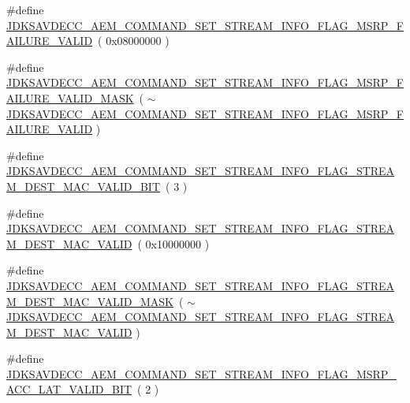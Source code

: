 \begin{DoxyCompactItemize}
\item 
\#define \hyperlink{group__command__set__stream__info_ga48cf25726faa693ebe64e3c71e38fd94}{J\+D\+K\+S\+A\+V\+D\+E\+C\+C\+\_\+\+A\+E\+M\+\_\+\+C\+O\+M\+M\+A\+N\+D\+\_\+\+S\+E\+T\+\_\+\+S\+T\+R\+E\+A\+M\+\_\+\+I\+N\+F\+O\+\_\+\+F\+L\+A\+G\+\_\+\+M\+S\+R\+P\+\_\+\+F\+A\+I\+L\+U\+R\+E\+\_\+\+V\+A\+L\+ID}~( 0x08000000 )
\item 
\#define \hyperlink{group__command__set__stream__info_gac39b2038ce5850cc7c1282abb61c1292}{J\+D\+K\+S\+A\+V\+D\+E\+C\+C\+\_\+\+A\+E\+M\+\_\+\+C\+O\+M\+M\+A\+N\+D\+\_\+\+S\+E\+T\+\_\+\+S\+T\+R\+E\+A\+M\+\_\+\+I\+N\+F\+O\+\_\+\+F\+L\+A\+G\+\_\+\+M\+S\+R\+P\+\_\+\+F\+A\+I\+L\+U\+R\+E\+\_\+\+V\+A\+L\+I\+D\+\_\+\+M\+A\+SK}~( $\sim$\hyperlink{group__command__set__stream__info_ga48cf25726faa693ebe64e3c71e38fd94}{J\+D\+K\+S\+A\+V\+D\+E\+C\+C\+\_\+\+A\+E\+M\+\_\+\+C\+O\+M\+M\+A\+N\+D\+\_\+\+S\+E\+T\+\_\+\+S\+T\+R\+E\+A\+M\+\_\+\+I\+N\+F\+O\+\_\+\+F\+L\+A\+G\+\_\+\+M\+S\+R\+P\+\_\+\+F\+A\+I\+L\+U\+R\+E\+\_\+\+V\+A\+L\+ID} )
\item 
\#define \hyperlink{group__command__set__stream__info_ga37f7565f16e7f28d3f6a6011d74adf4e}{J\+D\+K\+S\+A\+V\+D\+E\+C\+C\+\_\+\+A\+E\+M\+\_\+\+C\+O\+M\+M\+A\+N\+D\+\_\+\+S\+E\+T\+\_\+\+S\+T\+R\+E\+A\+M\+\_\+\+I\+N\+F\+O\+\_\+\+F\+L\+A\+G\+\_\+\+S\+T\+R\+E\+A\+M\+\_\+\+D\+E\+S\+T\+\_\+\+M\+A\+C\+\_\+\+V\+A\+L\+I\+D\+\_\+\+B\+IT}~( 3 )
\item 
\#define \hyperlink{group__command__set__stream__info_gaeade7ce92575e0d1232858e16f73758d}{J\+D\+K\+S\+A\+V\+D\+E\+C\+C\+\_\+\+A\+E\+M\+\_\+\+C\+O\+M\+M\+A\+N\+D\+\_\+\+S\+E\+T\+\_\+\+S\+T\+R\+E\+A\+M\+\_\+\+I\+N\+F\+O\+\_\+\+F\+L\+A\+G\+\_\+\+S\+T\+R\+E\+A\+M\+\_\+\+D\+E\+S\+T\+\_\+\+M\+A\+C\+\_\+\+V\+A\+L\+ID}~( 0x10000000 )
\item 
\#define \hyperlink{group__command__set__stream__info_gacd1c2aed1935c2d72effa37dcd8f0bc6}{J\+D\+K\+S\+A\+V\+D\+E\+C\+C\+\_\+\+A\+E\+M\+\_\+\+C\+O\+M\+M\+A\+N\+D\+\_\+\+S\+E\+T\+\_\+\+S\+T\+R\+E\+A\+M\+\_\+\+I\+N\+F\+O\+\_\+\+F\+L\+A\+G\+\_\+\+S\+T\+R\+E\+A\+M\+\_\+\+D\+E\+S\+T\+\_\+\+M\+A\+C\+\_\+\+V\+A\+L\+I\+D\+\_\+\+M\+A\+SK}~( $\sim$\hyperlink{group__command__set__stream__info_gaeade7ce92575e0d1232858e16f73758d}{J\+D\+K\+S\+A\+V\+D\+E\+C\+C\+\_\+\+A\+E\+M\+\_\+\+C\+O\+M\+M\+A\+N\+D\+\_\+\+S\+E\+T\+\_\+\+S\+T\+R\+E\+A\+M\+\_\+\+I\+N\+F\+O\+\_\+\+F\+L\+A\+G\+\_\+\+S\+T\+R\+E\+A\+M\+\_\+\+D\+E\+S\+T\+\_\+\+M\+A\+C\+\_\+\+V\+A\+L\+ID} )
\item 
\#define \hyperlink{group__command__set__stream__info_ga7c92779d88892522838f66c75aafba69}{J\+D\+K\+S\+A\+V\+D\+E\+C\+C\+\_\+\+A\+E\+M\+\_\+\+C\+O\+M\+M\+A\+N\+D\+\_\+\+S\+E\+T\+\_\+\+S\+T\+R\+E\+A\+M\+\_\+\+I\+N\+F\+O\+\_\+\+F\+L\+A\+G\+\_\+\+M\+S\+R\+P\+\_\+\+A\+C\+C\+\_\+\+L\+A\+T\+\_\+\+V\+A\+L\+I\+D\+\_\+\+B\+IT}~( 2 )

\end{DoxyCompactItemize}
